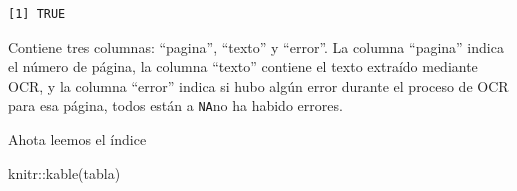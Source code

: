 \documentclass[
  letterpaper,
  DIV=11,
  numbers=noendperiod]{scrreprt}
\newenvironment{Shaded}{\begin{snugshade}}{\end{snugshade}}
\newcommand{\FunctionTok}[1]{\textcolor[rgb]{0.28,0.35,0.67}{#1}}
\newcommand{\NormalTok}[1]{\textcolor[rgb]{0.00,0.23,0.31}{#1}}
\newcommand{\SpecialCharTok}[1]{\textcolor[rgb]{0.37,0.37,0.37}{#1}}
\begin{document}
\begin{verbatim}
[1] TRUE
\end{verbatim}

Contiene tres columnas: ``pagina'', ``texto'' y ``error''. La columna
``pagina'' indica el número de página, la columna ``texto'' contiene el
texto extraído mediante OCR, y la columna ``error'' indica si hubo algún
error durante el proceso de OCR para esa página, todos están a
\texttt{NA}no ha habido errores.

Ahota leemos el índice

\begin{Shaded}
\begin{Highlighting}[]
\NormalTok{knitr}\SpecialCharTok{::}\FunctionTok{kable}\NormalTok{(tabla)}
\end{Highlighting}
\end{Shaded}
\end{document}
